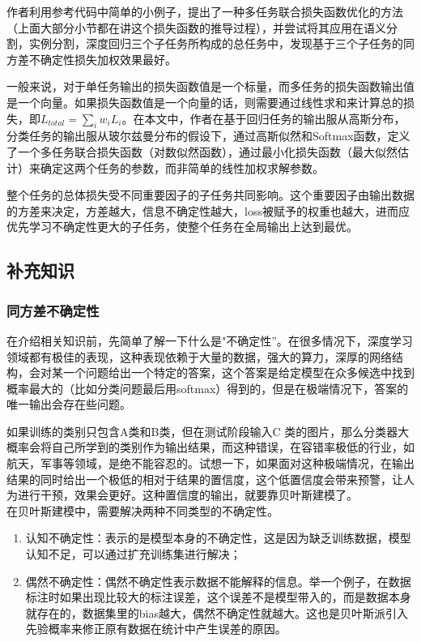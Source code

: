 作者利用参考代码中简单的小例子，提出了一种多任务联合损失函数优化的方法（上面大部分小节都在讲这个损失函数的推导过程），并尝试将其应用在语义分割，实例分割，深度回归三个子任务所构成的总任务中，发现基于三个子任务的同方差不确定性损失加权效果最好。

一般来说，对于单任务输出的损失函数值是一个标量，而多任务的损失函数输出值是一个向量。如果损失函数值是一个向量的话，则需要通过线性求和来计算总的损失，即$L_{total}    = \sum_i w_i L_i$。在本文中，作者在基于回归任务的输出服从高斯分布，分类任务的输出服从玻尔兹曼分布的假设下，通过高斯似然和Softmax函数，定义了一个多任务联合损失函数（对数似然函数），通过最小化损失函数（最大似然估计）来确定这两个任务的参数，而非简单的线性加权求解参数。

整个任务的总体损失受不同重要因子的子任务共同影响。这个重要因子由输出数据的方差来决定，方差越大，信息不确定性越大，loss被赋予的权重也越大，进而应优先学习不确定性更大的子任务，使整个任务在全局输出上达到最优。

\subsection{补充知识}

\subsubsection{同方差不确定性}

在介绍相关知识前，先简单了解一下什么是"不确定性”。在很多情况下，深度学习领域都有极佳的表现，这种表现依赖于大量的数据，强大的算力，深厚的网络结构，会对某一个问题给出一个特定的答案，这个答案是给定模型在众多候选中找到概率最大的（比如分类问题最后用softmax）得到的，但是在极端情况下，答案的唯一输出会存在些问题。

如果训练的类别只包含A类和B类，但在测试阶段输入C 类的图片，那么分类器大概率会将自己所学到的类别作为输出结果，而这种错误，在容错率极低的行业，如航天，军事等领域，是绝不能容忍的。试想一下，如果面对这种极端情况，在输出结果的同时给出一个极低的相对于结果的置信度，这个低置信度会带来预警，让人为进行干预，效果会更好。这种置信度的输出，就要靠贝叶斯建模了。\\

在贝叶斯建模中，需要解决两种不同类型的不确定性。
\begin{enumerate}
    \item 认知不确定性：表示的是模型本身的不确定性，这是因为缺乏训练数据，模型认知不足，可以通过扩充训练集进行解决；
    \item 偶然不确定性：偶然不确定性表示数据不能解释的信息。举一个例子，在数据标注时如果出现比较大的标注误差，这个误差不是模型带入的，而是数据本身就存在的，数据集里的bias越大，偶然不确定性就越大。这也是贝叶斯派引入先验概率来修正原有数据在统计中产生误差的原因。
\end{enumerate}

